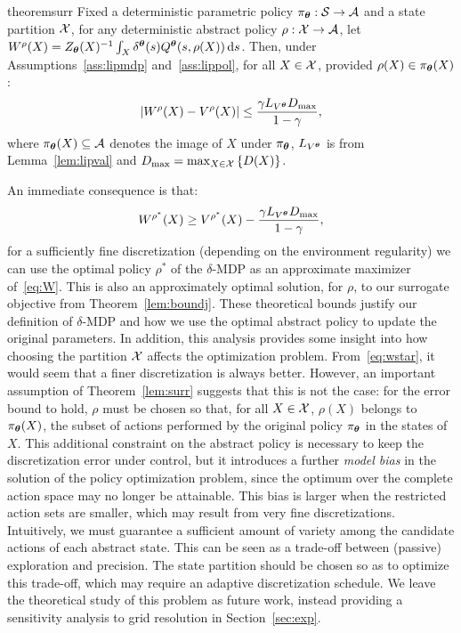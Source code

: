 %
\begin{restatable}{theorem}{surr}\label{lem:surr}
	Fixed a deterministic parametric policy ${\pi_{\boldsymbol{\theta}}:\mathcal{S}\to\mathcal{A}}$ and a state partition $\mathcal{X}$, for any deterministic abstract policy $\rho:\mathcal{X}\to\mathcal{A}$, let $W^{\rho}(X) = Z_{\boldsymbol{\theta}}(X)^{-1}\int_{X}\delta^{\boldsymbol{\theta}}(s)Q^{\boldsymbol{\theta}}(s,\rho(X))\,\mathrm{d} s$. Then, under Assumptions~\ref{ass:lipmdp} and~\ref{ass:lippol}, for all $X\in\mathcal{X}$, provided $\rho(X) \in \pi_{\boldsymbol{\theta}}(X)$:
	\begin{align*}
	|W^{\rho}(X) - V^{\rho}(X)| \leq \frac{\gamma L_{V^{\boldsymbol{\theta}}}D_{\max}}{1-\gamma},
	\end{align*}
	where $\pi_{\boldsymbol{\theta}}(X)\subseteq\mathcal{A}$ denotes the image of $X$ under $\pi_{\boldsymbol{\theta}}$, $L_{V^{\boldsymbol{\theta}}}$ is from Lemma~\ref{lem:lipval} and $D_{\max} = \max_{X\in\mathcal{X}}\left\{D(X)\right\}$.
\end{restatable}
%
An immediate consequence is that: 
\begin{align}\label{eq:wstar}
W^{\rho^*}(X) \geq V^{\rho^*}(X) - \frac{\gamma L_{V^{\boldsymbol{\theta}}}D_{\max}}{1-\gamma},
\end{align}
\ie for a sufficiently fine discretization (depending on the environment regularity) we can use the optimal policy $\rho^{*}$ of the $\delta$-MDP as an approximate maximizer of~\eqref{eq:W}. This is also an approximately optimal solution, for $\rho$, to our surrogate objective from Theorem~\ref{lem:boundj}.
%
These theoretical bounds justify our definition of $\delta$-MDP and how we use the optimal abstract policy to update the original parameters.
In addition, this analysis provides some insight into how choosing the partition $\mathcal{X}$ affects the optimization problem. From~\eqref{eq:wstar}, it would seem that a finer discretization is always better. However, an important assumption of Theorem~\ref{lem:surr} suggests that this is not the case: for the error bound to hold, $\rho$ must be chosen so that, for all $X\in\mathcal{X}$, $\rho(X)$ belongs to $\pi_{\boldsymbol{\theta}}(X)$, the subset of actions performed by the original policy $\pi_{\boldsymbol{\theta}}$ in the states of $X$. This additional constraint on the abstract policy is necessary to keep the discretization error under control, but it introduces a further \textit{model bias} in the solution of the policy optimization problem, since the optimum over the complete action space may no longer be attainable. This bias is larger when the restricted action sets are smaller, which may result from very fine discretizations. 
%
Intuitively, we must guarantee a sufficient amount of variety among the candidate actions of each abstract state. This can be seen as a trade-off between (passive) exploration and precision. The state partition should be chosen so as to optimize this trade-off, which may require an adaptive discretization schedule. We leave the theoretical study of this problem as future work, instead providing a sensitivity analysis to grid resolution in Section~\ref{sec:exp}.

